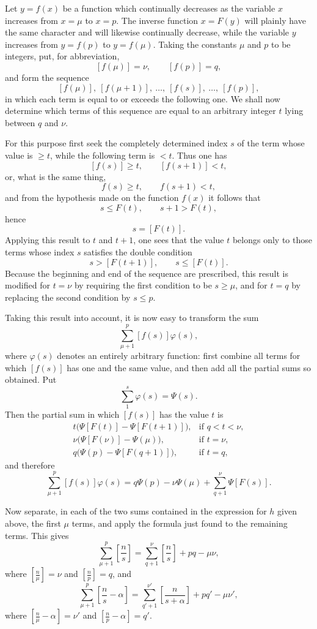 \documentclass[11pt]{article}
\newcommand{\floor}[1]{\left[#1\right]}
\begin{document}
Let $y=f(x)$ be a function which continually decreases as the variable $x$ increases from $x=\mu$ to $x=p$. The inverse function $x=F(y)$ will plainly have the same character and will likewise continually decrease, while the variable $y$ increases from $y=f(p)$ to $y=f(\mu)$. Taking the constants $\mu$ and $p$ to be integers, put, for abbreviation,
\[
 [f(\mu)]=\nu,\qquad [f(p)]=q,
\]
and form the sequence
\[
 [f(\mu)],\ [f(\mu+1)],\ \ldots,\ [f(s)],\ \ldots,\ [f(p)],
\]
in which each term is equal to or exceeds the following one. We shall now determine which terms of this sequence are equal to an arbitrary integer $t$ lying between $q$ and $\nu$.

For this purpose first seek the completely determined index $s$ of the term whose value is $\geq t$, while the following term is $<t$. Thus one has
\[
 [f(s)]\geq t,\qquad [f(s+1)]<t,
\]
or, what is the same thing,
\[
 f(s)\geq t,\qquad f(s+1)<t,
\]
and from the hypothesis made on the function $f(x)$ it follows that
\[
 s\leq F(t),\qquad s+1>F(t),
\]
hence
\[
 s=\floor{F(t)}.
\]
Applying this result to $t$ and $t+1$, one sees that the value $t$ belongs only to those terms whose index $s$ satisfies the double condition
\[
 s>\floor{F(t+1)},\qquad s\leq\floor{F(t)}.
\]
Because the beginning and end of the sequence are prescribed, this result is modified for $t=\nu$ by requiring the first condition to be $s\geq\mu$, and for $t=q$ by replacing the second condition by $s\leq p$.

Taking this result into account, it is now easy to transform the sum
\[
 \sum_{\mu+1}^{p}[f(s)]\varphi(s),
\]
where $\varphi(s)$ denotes an entirely arbitrary function: first combine all terms for which $[f(s)]$ has one and the same value, and then add all the partial sums so obtained. Put
\[
 \sum_1^s\varphi(s)=\Psi(s).
\]
Then the partial sum in which $[f(s)]$ has the value $t$ is
\[
\begin{array}{ll}
 t\bigl(\Psi[F(t)]-\Psi[F(t+1)]\bigr), & \text{if } q<t<\nu,\\[0.3em]
 \nu\bigl(\Psi[F(\nu)]-\Psi(\mu)\bigr), & \text{if } t=\nu,\\[0.3em]
 q\bigl(\Psi(p)-\Psi[F(q+1)]\bigr), & \text{if } t=q,
\end{array}
\]
and therefore
\[
 \sum_{\mu+1}^{p}[f(s)]\varphi(s)
 =q\Psi(p)-\nu\Psi(\mu)+\sum_{q+1}^{\nu}\Psi[F(s)].
\]

Now separate, in each of the two sums contained in the expression for $h$ given above, the first $\mu$ terms, and apply the formula just found to the remaining terms. This gives
\[
 \sum_{\mu+1}^{p}\floor{\frac ns}=\sum_{q+1}^{\nu}\floor{\frac ns}+pq-\mu\nu,
\]
where $\floor{\frac n\mu}=\nu$ and $\floor{\frac np}=q$, and
\[
 \sum_{\mu+1}^{p}\floor{\frac ns-\alpha}=\sum_{q'+1}^{\nu'}\floor{\frac n{s+\alpha}}+pq'-\mu\nu',
\]
where $\floor{\frac n\mu-\alpha}=\nu'$ and $\floor{\frac np-\alpha}=q'$.
\end{document}
